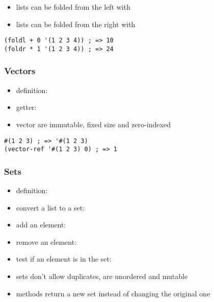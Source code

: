 \documentclass[a4paper,landscape,10pt]{article}
\begin{document}
\begin{multicols*}{2}
  \begin{itemize}
    \item lists can be folded from the left with 
    \item lists can be folded from the right with 
  \end{itemize}

  \begin{lstlisting}[language=Racket]
(foldl + 0 '(1 2 3 4)) ; => 10
(foldr * 1 '(1 2 3 4)) ; => 24
  \end{lstlisting}

  \subsubsection{Vectors}

  \begin{itemize}
    \item definition: 
    \item getter: 
    \item vector are immutable, fixed size and zero-indexed
  \end{itemize}

  \begin{lstlisting}[language=Racket]
#(1 2 3) ; => '#(1 2 3)
(vector-ref '#(1 2 3) 0) ; => 1
  \end{lstlisting}

  \breakcolumn

  \subsubsection{Sets}

  \begin{itemize}
    \item definition: 
    \item convert a list to a set: 
    \item add an element: 
    \item remove an element: 
    \item test if an element is in the set: 
    \item sets don't allow duplicates, are unordered and mutable
    \item methods return a new set instead of changing the original one
  \end{itemize}


\end{multicols*}
\end{document}
